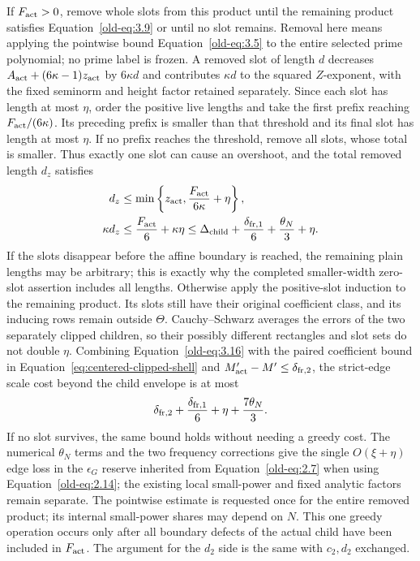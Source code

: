 \documentclass[11pt,a4paper]{article}
\numberwithin{equation}{section}
\numberwithin{figure}{section}
\theoremstyle{definition}
\theoremstyle{remark}
\begin{document}
If \(F_{\rm act}>0\), remove whole slots from this product until the
remaining product satisfies Equation~\eqref{old-eq:3.9} or
until no slot remains.  Removal here means applying the pointwise
bound Equation~\eqref{old-eq:3.5} to the entire selected prime
polynomial; no prime label is frozen.  A removed slot of length
\(d\) decreases \(A_{\rm act}+(6\kappa-1)z_{\rm act}\) by \(6\kappa d\)
and contributes \(\kappa d\) to the squared \(Z\)-exponent, with the
fixed seminorm and height factor retained separately.  Since each
slot has length at most \(\eta\), order the positive live lengths
and take the first prefix reaching \(F_{\rm act}/(6\kappa)\).
Its preceding prefix is smaller than that threshold and its final
slot has length at most \(\eta\).  If no prefix reaches the threshold,
remove all slots, whose total is smaller.  Thus exactly one slot can
cause an overshoot, and the total removed length \(d_z\) satisfies
\begin{equation}
 \begin{split}
 d_z&\le\min\left\{z_{\rm act},
                     \frac{F_{\rm act}}{6\kappa}+\eta\right\},\\
 \kappa d_z&\le\frac{F_{\rm act}}6+\kappa\eta
 \le\Delta_{\rm child}+\frac{\delta_{{\rm fr},1}}6
                       +\frac{\theta_N}{3}+\eta.
 \end{split}
 \label{old-eq:3.16}
\end{equation}
If the slots disappear before the affine boundary is reached, the
remaining plain lengths may be arbitrary; this is exactly why the
completed smaller-width zero-slot assertion includes all lengths.
Otherwise apply the positive-slot induction to the remaining
product.  Its slots still have their original coefficient class,
and its inducing rows remain outside \(\Theta\).  Cauchy--Schwarz
averages the errors of the two separately clipped children, so their
possibly different rectangles and slot sets do not double \(\eta\).
Combining Equation~\eqref{old-eq:3.16} with the paired coefficient
bound in Equation~\eqref{eq:centered-clipped-shell} and
\(M'_{\rm act}-M'\le\delta_{{\rm fr},2}\), the strict-edge scale
cost beyond the child envelope is at most
\begin{equation}
 \delta_{{\rm fr},2}+\frac{\delta_{{\rm fr},1}}6
        +\eta+\frac{7\theta_N}{3}.
 \label{eq:centered-child-edge-cost}
\end{equation}
If no slot survives, the same bound holds without needing a greedy cost.
The numerical \(\theta_N\) terms and the two frequency corrections
give the single \(O(\xi+\eta)\) edge loss in the \(\epsilon_G\)
reserve inherited from Equation~\eqref{old-eq:2.7} when using
Equation~\eqref{old-eq:2.14}; the existing local small-power and fixed
analytic factors remain separate.  The pointwise estimate is requested
once for the entire removed product; its internal small-power shares
may depend on \(N\).  This one greedy operation occurs only after
all boundary defects of the actual child have been included in
\(F_{\rm act}\).  The argument for the \(d_2\)
side is the same with \(c_2,d_2\) exchanged.
\end{document}
